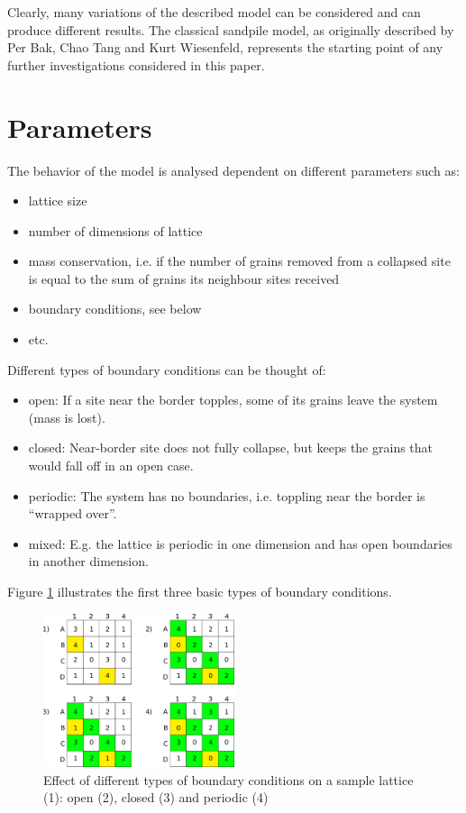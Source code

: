 Clearly, many variations of the described model can be considered and can produce different results. The classical sandpile model, as originally described by Per Bak, Chao Tang and Kurt Wiesenfeld, represents the starting point of any further investigations considered in this paper.

\section{Parameters}
The behavior of the model is analysed dependent on different parameters such as:
\begin{itemize}
 \item lattice size
 \item number of dimensions of lattice
 \item mass conservation, i.e. if the number of grains removed from a collapsed site is equal to the sum of grains its neighbour sites received
 \item boundary conditions, see below
 \item etc.
\end{itemize}
Different types of boundary conditions can be thought of:
\begin{itemize}
 \item open: If a site near the border topples, some of its grains leave the system (mass is lost).
 \item closed: Near-border site does not fully collapse, but keeps the grains that would fall off in an open case.
 \item periodic: The system has no boundaries, i.e. toppling near the border is ``wrapped over''.
 \item mixed: E.g. the lattice is periodic in one dimension and has open boundaries in another dimension.
\end{itemize}
Figure \ref{pics:boundary} illustrates the first three basic types of boundary conditions.

\begin{figure}[!htpb]
\centering
\includegraphics[width=0.5\textwidth]{pics/pic4_boundary.pdf}
\caption[]{Effect of different types of boundary conditions on a sample lattice (1): open (2), closed (3) and periodic (4)}
\label{pics:boundary}
\end{figure}

